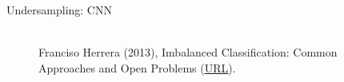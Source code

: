 \documentclass[11pt,compress,t,notes=noshow, xcolor=table]{beamer}
\begin{document}
\begin{frame}{Undersampling: CNN}
{\begin{minipage}{0.55\textwidth}
\begin{itemize}
\begin{enumerate}
				\end{enumerate}	
%		
			\end{itemize}			
		\end{minipage}
		\begin{minipage}{0.4\textwidth}
			\begin{figure}
				\centering
							\tiny
				\\ Franciso Herrera (2013), Imbalanced Classification: Common
				Approaches and Open Problems (\href{https://sci2s.ugr.es/sites/default/files/files/TutorialsAndPlenaryTalks/SSTiC-Trends in-Classification-Imbalanced-data-sets.pdf}{\underline{URL}}).
			\end{figure}
		\end{minipage}
	}
	\end{frame}
	
\end{document}
